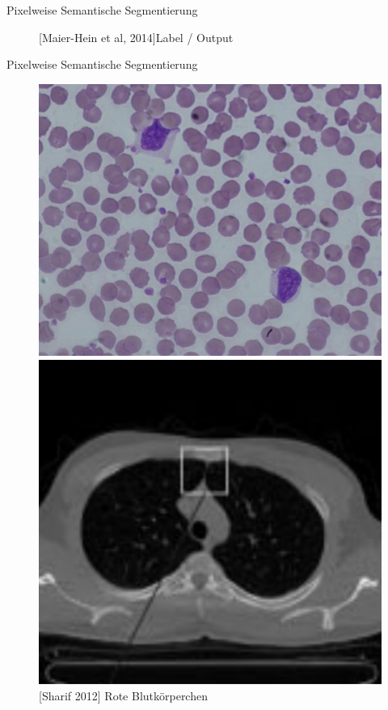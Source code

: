\begin{frame}{Pixelweise Semantische Segmentierung}
\begin{figure}[ht]
\begin{minipage}[b]{0.45\linewidth}
            \caption{[Maier-Hein et al, 2014]\hspace{\textwidth}Label / Output}
            \label{fig:label}
        \end{minipage}
    \end{figure}
\end{frame}

\begin{frame}{Pixelweise Semantische Segmentierung}
    \begin{figure}[ht]
        \begin{minipage}[b]{0.45\linewidth}
            \centering
            \includegraphics[width=\textwidth]{../images/red-blood.png}
            \caption{[Sharif 2012] Rote Blutkörperchen}
            \label{fig:red-blood}
        \end{minipage}
        \hspace{0.5cm}
        \begin{minipage}[b]{0.45\linewidth}
            \centering
            \includegraphics[width=\textwidth]{../images/lung.png}

\end{minipage}
\end{figure}
\end{frame}
